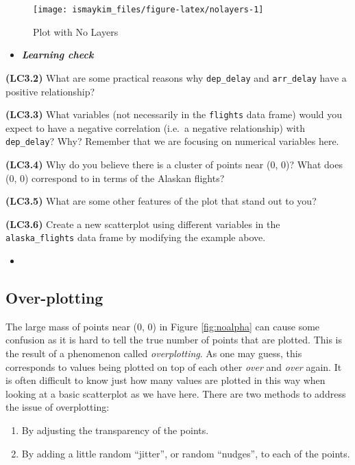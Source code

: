 \documentclass[12pt, krantz2,]{krantz}
\providecommand{\tightlist}{%
  \setlength{\itemsep}{0pt}\setlength{\parskip}{0pt}}
\newenvironment{rmdblock}[1]
  {\begin{shaded*}
  \begin{itemize}
  \renewcommand{\labelitemi}{
    \raisebox{-.7\height}[0pt][0pt]{
    }
  }
  \item
  }
  {
  \end{itemize}
  \end{shaded*}
  }
\newenvironment{learncheck}
  {\begin{rmdblock}{warning}}
  {\end{rmdblock}}
\begin{document}
\begin{figure}

{\centering \texttt{[image: ismaykim\_files/figure-latex/nolayers-1]} 

}

\caption{Plot with No Layers}\label{fig:nolayers}
\end{figure}

\begin{learncheck}
\textbf{\emph{Learning check}}
\end{learncheck}

\textbf{(LC3.2)} What are some practical reasons why \texttt{dep\_delay} and \texttt{arr\_delay} have a positive relationship?

\textbf{(LC3.3)} What variables (not necessarily in the \texttt{flights} data frame) would you expect to have a negative correlation (i.e.~a negative relationship) with \texttt{dep\_delay}? Why? Remember that we are focusing on numerical variables here.

\textbf{(LC3.4)} Why do you believe there is a cluster of points near (0, 0)? What does (0, 0) correspond to in terms of the Alaskan flights?

\textbf{(LC3.5)} What are some other features of the plot that stand out to you?

\textbf{(LC3.6)} Create a new scatterplot using different variables in the \texttt{alaska\_flights} data frame by modifying the example above.

\begin{learncheck}

\end{learncheck}

\hypertarget{overplotting}{%
\subsection{Over-plotting}\label{overplotting}}

The large mass of points near (0, 0) in Figure \ref{fig:noalpha} can cause some confusion as it is hard to tell the true number of points that are plotted. This is the result of a phenomenon called \emph{overplotting}. As one may guess, this corresponds to values being plotted on top of each other \emph{over} and \emph{over} again. It is often difficult to know just how many values are plotted in this way when looking at a basic scatterplot as we have here. There are two methods to address the issue of overplotting:

\begin{enumerate}
\def\labelenumi{\arabic{enumi}.}
\tightlist
\item
  By adjusting the transparency of the points.
\item
  By adding a little random ``jitter'', or random ``nudges'', to each of the points.
\end{enumerate}
\end{document}

